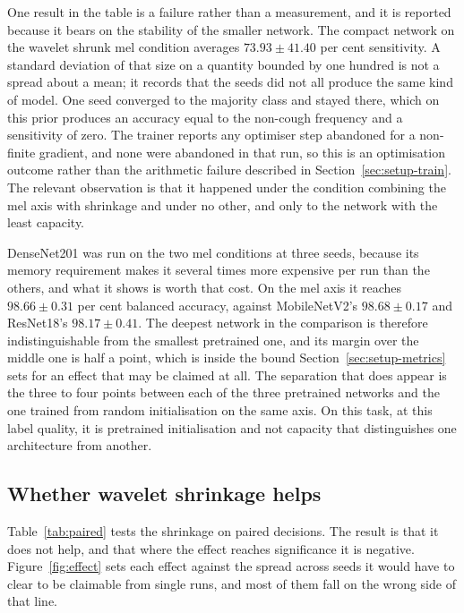 \documentclass[pdflatex,sn-mathphys-num]{sn-jnl}
\newcommand{\figref}[1]{Figure~\ref{#1}}
\begin{document}
One result in the table is a failure rather than a measurement, and it is reported because
it bears on the stability of the smaller network. The compact network on the wavelet
shrunk mel condition averages $73.93 \pm 41.40$ per cent sensitivity. A standard deviation
of that size on a quantity bounded by one hundred is not a spread about a mean; it records
that the seeds did not all produce the same kind of model. One seed converged to the
majority class and stayed there, which on this prior produces an accuracy equal to the
non-cough frequency and a sensitivity of zero. The trainer reports any optimiser step
abandoned for a non-finite gradient, and none were abandoned in that run, so this is an
optimisation outcome rather than the arithmetic failure described in
Section~\ref{sec:setup-train}. The relevant observation is that it happened under the
condition combining the mel axis with shrinkage and under no other, and only to the
network with the least capacity.

DenseNet201 was run on the two mel conditions at three seeds, because its memory
requirement makes it several times more expensive per run than the others, and what it
shows is worth that cost. On the mel axis it reaches $98.66 \pm 0.31$ per cent balanced
accuracy, against MobileNetV2's $98.68 \pm 0.17$ and ResNet18's $98.17 \pm 0.41$. The
deepest network in the comparison is therefore indistinguishable from the smallest
pretrained one, and its margin over the middle one is half a point, which is inside the
bound Section~\ref{sec:setup-metrics} sets for an effect that may be claimed at all. The
separation that does appear is the three to four points between each of the three
pretrained networks and the one trained from random initialisation on the same axis. On
this task, at this label quality, it is pretrained initialisation and not capacity that
distinguishes one architecture from another.

\subsection{Whether wavelet shrinkage helps}\label{sec:res-denoise}

Table~\ref{tab:paired} tests the shrinkage on paired decisions. The result is that it does
not help, and that where the effect reaches significance it is negative. \figref{fig:effect} sets each effect against the spread across seeds it would have to clear to be claimable from single runs, and most of them fall on the wrong side of that line.
\end{document}
